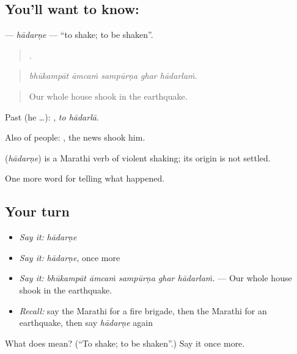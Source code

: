 \subsection*{You'll want to know: }
\textbf{} — \emph{hādarṇe} — \textquotedblleft{}to shake; to be shaken\textquotedblright{}.

\begin{quote}
    .
\end{quote}

\begin{quote}
\emph{bhūkampāt āmcaṁ sampūrṇa ghar hādarlaṁ.}
\end{quote}

\begin{quote}
Our whole house shook in the earthquake.
\end{quote}

Past (he …):  , \emph{to hādarlā}.

Also of people:     , the news shook him.

\begin{cousinweb}
\textbf{} (\emph{hādarṇe}) is a Marathi verb of violent shaking; its origin is not settled.
\end{cousinweb}

\begin{grammarlens}[title={What you've built}]
One more word for telling what happened.
\end{grammarlens}

\subsection*{Your turn}
\begin{itemize}
\raggedright
  \item \emph{Say it:} \emph{hādarṇe}
  \item \emph{Say it:} \emph{hādarṇe}, once more
  \item \emph{Say it:} \emph{bhūkampāt āmcaṁ sampūrṇa ghar hādarlaṁ.} — Our whole house shook in the earthquake.
  \item \emph{Recall:} say the Marathi for a fire brigade, then the Marathi for an earthquake, then say \emph{hādarṇe} again
\end{itemize}

\begin{tcolorbox}[breakable,colback=teal!4,colframe=teal!35!black,title={Before you move on}]
What does  mean? (\textquotedblleft{}To shake; to be shaken\textquotedblright{}.) Say it once more.
\end{tcolorbox}
